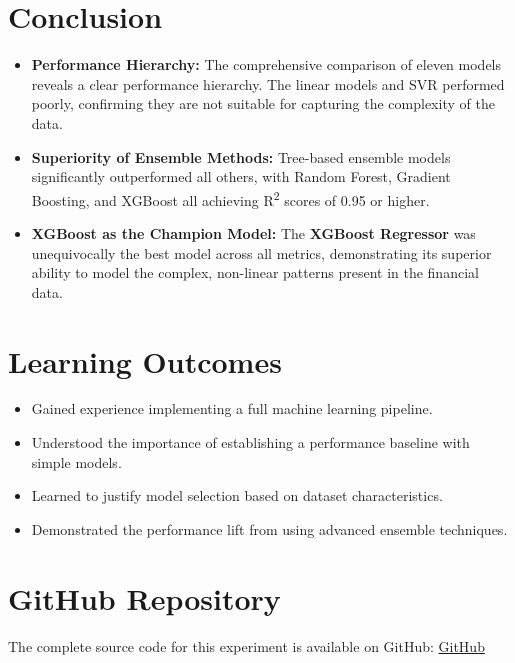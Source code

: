 \documentclass[12pt]{article}
\begin{document}
\section{Conclusion}
\begin{itemize}
    \item \textbf{Performance Hierarchy:} The comprehensive comparison of eleven models reveals a clear performance hierarchy. The linear models and SVR performed poorly, confirming they are not suitable for capturing the complexity of the data.
    \item \textbf{Superiority of Ensemble Methods:} Tree-based ensemble models significantly outperformed all others, with Random Forest, Gradient Boosting, and XGBoost all achieving R\textsuperscript{2} scores of 0.95 or higher.
    \item \textbf{XGBoost as the Champion Model:} The \textbf{XGBoost Regressor} was unequivocally the best model across all metrics, demonstrating its superior ability to model the complex, non-linear patterns present in the financial data.
\end{itemize}

\section{Learning Outcomes}
\begin{itemize}
    \item Gained experience implementing a full machine learning pipeline.
    \item Understood the importance of establishing a performance baseline with simple models.
    \item Learned to justify model selection based on dataset characteristics.
    \item Demonstrated the performance lift from using advanced ensemble techniques.
\end{itemize}

\section*{GitHub Repository}
The complete source code for this experiment is available on GitHub:
\href{https://github.com/yuvashreeph/Machine-Learning/tree/main/Assignment2}{GitHub}
\end{document}
